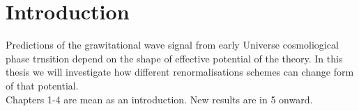 \chapter{Introduction}
Predictions of the grawitational wave signal from early Universe cosmoliogical phase trnsition 
depend on the shape of effective potential of the theory. 
In this thesis we will investigate how different renormalisations schemes can change 
form of that potential. \\

Chapters 1-4 are mean as an introduction.
New results are in 5 onward.

